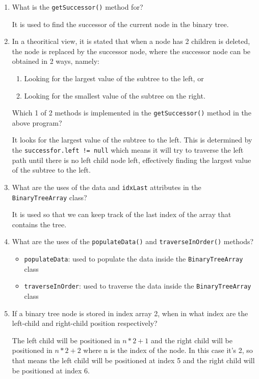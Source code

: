 \documentclass[12pt,titlepage]{article}
\begin{document}
\begin{enumerate}
{        It is used to check if the current node is a left child.
    }
    \item {
        What is the \texttt{getSuccessor()} method for?

        It is used to find the successor of the current node in the binary tree.
    }
    \item {
        In a theoritical view, it is stated that when a node has 2 children is deleted, the node is replaced by the successor node, where the successor node
        can be obtained in 2 ways, namely:
        \begin{enumerate}
            \item Looking for the largest value of the subtree to the left, or
            \item Looking for the smallest value of the subtree on the right.
        \end{enumerate}
        Which 1 of 2 methods is implemented in the \texttt{getSuccessor()} method in the above program?

        It looks for the largest value of the subtree to the left. This is determined by the \texttt{successfor.left != null} which means it will try to traverse
        the left path until there is no left child node left, effectively finding the largest value of the subtree to the left.
    }
    \item {
        What are the uses of the data and \texttt{idxLast} attributes in the \texttt{BinaryTreeArray} class?

        It is used so that we can keep track of the last index of the array that contains the tree.
    }
    \item {
        What are the uses of the \texttt{populateData()} and \texttt{traverseInOrder()} methods?

        \begin{itemize}
            \item \texttt{populateData}: used to populate the data inside the \texttt{BinaryTreeArray} class
            \item \texttt{traverseInOrder}: used to traverse the data inside the \texttt{BinaryTreeArray} class
        \end{itemize}
    }
    \item {
        If a binary tree node is stored in index array 2, when in what index are the left-child and right-child position respectively?

        The left child will be positioned in $n * 2 + 1$ and the right child will be positioned in $n * 2 + 2$ where n is the index of the node.
        In this case it's 2, so that means the left child will be positioned at index 5 and the right child will be positioned at index 6.
    }
\end{enumerate}
\end{document}

